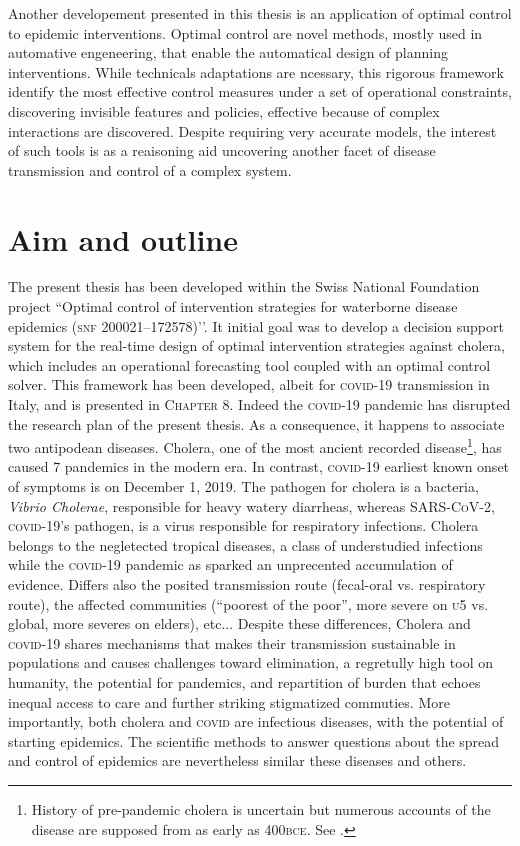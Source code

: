 Another developement presented in this thesis is an application of optimal control to epidemic interventions. Optimal control are novel methods, mostly used in automative engeneering, that enable the automatical design of planning interventions. While technicals adaptations are ncessary, this rigorous framework identify the most effective control measures under a set of operational constraints, discovering invisible features and policies, effective because of complex interactions are discovered. Despite requiring very accurate models, the interest of such tools is as a reaisoning aid uncovering another facet of disease transmission and control of a complex system.

\section{Aim and outline} 
The present thesis has been developed within the Swiss National Foundation project ``Optimal control of intervention strategies for waterborne disease epidemics (\textsc{snf} 200021–172578)’’. It initial goal was to develop a decision support system for the real-time design of optimal intervention strategies against cholera, which includes an operational forecasting tool coupled with an optimal control solver. This framework has been developed, albeit for \textsc{covid}-19 transmission in Italy, and is presented in \textsc{Chapter 8}. Indeed the \textsc{covid}-19 pandemic has disrupted the research plan of the present thesis. As a consequence, it happens to associate two antipodean diseases. Cholera, one of the most ancient recorded disease\footnote[][10\baselineskip]{History of pre-pandemic cholera is uncertain but numerous accounts of the disease are supposed from as early as 400\textsc{bce}. See .}, has caused 7 pandemics in the modern era. In contrast, \textsc{covid}-19 earliest known onset of symptoms is on December 1, 2019. The pathogen for cholera is a bacteria, \textit{Vibrio Cholerae}, responsible for heavy watery diarrheas, whereas \textsc{SARS-CoV-2}, \textsc{covid}-19’s pathogen, is a virus responsible for respiratory infections. Cholera belongs to the negletected tropical diseases, a class of understudied infections while the \textsc{covid}-19 pandemic as sparked an unprecented accumulation of evidence\cite{COVID-19OpenAccessProject:LivingEvidenceCOVID19:2020}. Differs also the posited transmission route (fecal-oral vs. respiratory route), the affected communities (``poorest of the poor”, more severe on \textsc{u5} vs. global, more severes on elders), etc... Despite these differences, Cholera and \textsc{covid}-19 shares mechanisms that makes their transmission sustainable in populations and causes challenges toward elimination, a regretully high tool on humanity, the potential for pandemics, and repartition of burden that echoes inequal access to care and further striking stigmatized commuties. More importantly, both cholera and \textsc{covid} are infectious diseases, with the potential of starting epidemics. The scientific methods to answer questions about the spread and control of epidemics are nevertheless similar these diseases and others.

